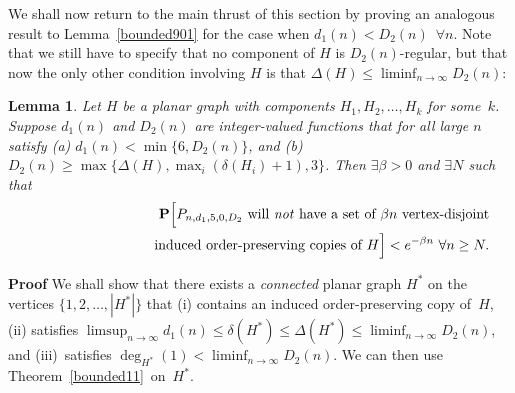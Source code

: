 \documentclass{article}
\newtheorem{Lemma}[Theorem]{Lemma}
\newtheorem{Proof of Theorem}{Proof of Theorem}
\begin{document}
We shall now return to the main thrust of this section
by proving an analogous result to Lemma~\ref{bounded901} 
for the case when $d_{1}(n) < D_{2}(n)$~$\forall n$.
Note that we still have to specify that no component of $H$ is $D_{2}(n)$-regular,
but that now the only other condition involving $H$ is that
$\Delta(H) \leq \liminf_{n \to \infty} D_{2}(n)$: 















\begin{Lemma} \label{bounded904}
Let $H$ be a planar graph with components $H_{1}, H_{2}, \ldots, H_{k}$ for some~$\!k$.
Suppose $d_{1}(n)$ and $D_{2}(n)$ are integer-valued functions that for all large $n$ satisfy
(a) $d_{1}(n) < \min \{ 6, D_{2}(n) \}$, and
(b) $D_{2}(n) \geq \max \{ \Delta(H), \max_{i} (\delta(H_{i})+1), 3 \}$.
Then $\exists \beta > 0$ and $\exists N$ such that
\begin{eqnarray*}
& & \mathbf{P} \Big[
\textrm{$P_{n,d_{1},5,0,D_{2}}$
will \emph{not} have a set of $\beta n$ vertex-disjoint} \\
& & \phantom{wwwwwwwwwwq}\textrm{induced order-preserving copies of $H$}\Big] 
< e^{- \beta n}~
\forall n \geq N.
\end{eqnarray*}
\end{Lemma}
\textbf{Proof}
We shall show that there exists a \textit{connected} planar graph $H^{*}$ on 
the vertices $\{ 1,2,\ldots,|H^{*}| \}$
that
(i) contains an induced order-preserving copy of~$H$,
(ii) satisfies 
$\limsup_{n \to \infty} d_{1}(n) \leq \delta(H^{*}) \leq \Delta(H^{*}) \leq \liminf_{n \to \infty} D_{2}(n)$,
and (iii)~satisfies $\deg_{H^{*}}(1) \!<\! \liminf_{n \to \infty} D_{2}(n)$.
We can then use Theorem~\ref{bounded11}~on~$H^{*}$.
\end{document}
